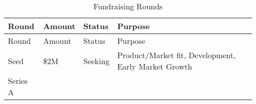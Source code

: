 \documentclass[10pt,openany]{book}
\begin{document}
\begin{longtable}[]{@{}llll@{}}
\caption{Fundraising Rounds}\tabularnewline
\toprule
\begin{minipage}[b]{0.13\columnwidth}\raggedright
Round\strut
\end{minipage} & \begin{minipage}[b]{0.09\columnwidth}\raggedright
Amount\strut
\end{minipage} & \begin{minipage}[b]{0.10\columnwidth}\raggedright
Status\strut
\end{minipage} & \begin{minipage}[b]{0.56\columnwidth}\raggedright
Purpose\strut
\end{minipage}\tabularnewline
\midrule
\endfirsthead
\toprule
\begin{minipage}[b]{0.13\columnwidth}\raggedright
Round\strut
\end{minipage} & \begin{minipage}[b]{0.09\columnwidth}\raggedright
Amount\strut
\end{minipage} & \begin{minipage}[b]{0.10\columnwidth}\raggedright
Status\strut
\end{minipage} & \begin{minipage}[b]{0.56\columnwidth}\raggedright
Purpose\strut
\end{minipage}\tabularnewline
\midrule
\endhead
\begin{minipage}[t]{0.13\columnwidth}\raggedright
Seed\strut
\end{minipage} & \begin{minipage}[t]{0.09\columnwidth}\raggedright
\$2M\strut
\end{minipage} & \begin{minipage}[t]{0.10\columnwidth}\raggedright
Seeking\strut
\end{minipage} & \begin{minipage}[t]{0.56\columnwidth}\raggedright
Product/Market fit, Development, Early Market Growth\strut
\end{minipage}\tabularnewline
\begin{minipage}[t]{0.13\columnwidth}\raggedright
Series A\strut
\end{minipage} & \begin{minipage}[t]{0.09\columnwidth}\raggedright
\strut
\end{minipage} & \begin{minipage}[t]{0.10\columnwidth}\raggedright
\strut
\end{minipage} & \begin{minipage}[t]{0.56\columnwidth}\raggedright

\end{minipage}
\end{longtable}
\end{document}

